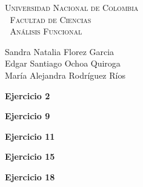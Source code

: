 \documentclass[12pt, a4paper]{article}%
\begin{document}
\setlength{\parindent}{0cm}
\hoffset-0.46cm
\voffset-1.46cm

\begin{window}
\large\scshape  \hspace{0.4cm}\textsf{Universidad Nacional de Colombia} \\
\textcolor{white}{\tiny.}  \large \hspace{1.5cm} \textsf{Facultad de Ciencias} \\
\textcolor{white}{\tiny.}   \normalsize\hspace{2.3cm}\textsf{Análisis Funcional}\\
 

\end{window}

\vspace{0.2cm}
\small
\textsf{Sandra Natalia Florez Garcia\\Edgar Santiago Ochoa Quiroga\\
María Alejandra  Rodríguez  Ríos} 
\normalsize
\dotfill
\vspace{0.7cm}

 \textbf{Ejercicio 2}
  

  \textbf{Ejercicio 9}
 
 
 

 \textbf{Ejercicio 11}
 
 
  \textbf{Ejercicio 15}
 

 \textbf{Ejercicio 18}
 






 
\end{document}
